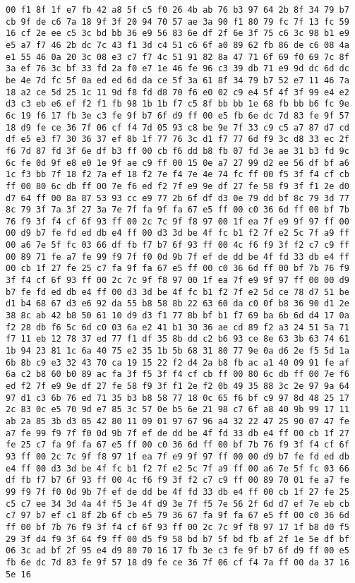 \documentclass{article}
\begin{document}
\begin{verbatim}
00 f1 8f 1f e7 fb 42 a8 5f c5 f0 26 4b ab 76 b3 97 64 2b 8f 34 79 b7 cb 9f de c6 7a 18 9f 3f 20 94 70 57 ae 3a 90 f1 80 79 fc 7f 13 fc 59 16 cf 2e ee c5 3c bd bb 36 e9 56 83 6e df 2f 6e 3f 75 c6 3c 98 b1 e9 e5 a7 f7 46 2b dc 7c 43 f1 3d c4 51 c6 6f a0 89 62 fb 86 de c6 08 4a e1 55 46 0a 20 3c 08 e3 c7 f7 4c 51 91 82 8a 47 71 6f 69 f0 69 7c 8f 3a ef 76 3c bf 33 fd 2a f0 e7 1e 46 fe 96 c3 39 db 71 e9 9d dc 6d dc be 4e 7d fc 5f 0a ed ed 6d da ce 5f 3a 61 8f 34 79 b7 52 e7 11 46 7a 18 a2 ce 5d 25 1c 11 9d f8 fd d8 70 f6 e0 02 c9 e4 5f 4f 3f 99 e4 e2 d3 c3 eb e6 ef f2 f1 fb 98 1b 1b f7 c5 8f bb bb 1e 68 fb bb b6 fc 9e 6c 19 f6 17 fb 3e c3 fe 9f b7 6f d9 ff 00 e5 fb 6e dc 7d 83 fe 9f 57 18 d9 fe ce 36 7f 06 cf f4 7d 05 93 c8 be 9e 7f 33 c9 c5 a7 87 d7 cd df e5 e3 f7 30 36 37 ef 8b 1f 77 76 3c d1 f7 77 6d f9 3c d8 33 ec 2f f6 7d 87 fd 3f 6e df b3 ff 00 cb f6 dd b8 fb 07 fd 3e ae 31 b3 fd 9c 6c fe 0d 9f e8 e0 1e 9f ae c9 ff 00 15 0e a7 27 99 d2 ee 56 df bf a6 1c f3 bb 7f 18 f2 7a ef 18 f2 7e f4 7e 4e 74 fc ff 00 f5 3f f4 cf cb ff 00 80 6c db ff 00 7e f6 ed f2 7f e9 9e df 27 fe 58 f9 3f f1 2e d0 d7 64 ff 00 8a 87 53 93 cc e9 77 2b 6f df d3 0e 79 dd bf 8c 79 3d 77 8c 79 3f 7a 3f 27 3a 7e 7f fa 9f fa 67 e5 ff 00 c0 36 6d ff 00 bf 7b 76 f9 3f f4 cf 6f 93 ff 00 2c 7c 9f f8 97 00 1f ea 7f e9 9f 97 ff 00 00 d9 b7 fe fd ed db e4 ff 00 d3 3d be 4f fc b1 f2 7f e2 5c 7f a9 ff 00 a6 7e 5f fc 03 66 df fb f7 b7 6f 93 ff 00 4c f6 f9 3f f2 c7 c9 ff 00 89 71 fe a7 fe 99 f9 7f f0 0d 9b 7f ef de dd be 4f fd 33 db e4 ff 00 cb 1f 27 fe 25 c7 fa 9f fa 67 e5 ff 00 c0 36 6d ff 00 bf 7b 76 f9 3f f4 cf 6f 93 ff 00 2c 7c 9f f8 97 00 1f ea 7f e9 9f 97 ff 00 00 d9 b7 fe fd ed db e4 ff 00 d3 3d be 4f fc b1 f2 7f e2 5d ce 78 d7 51 be d1 b4 68 67 d3 e6 92 da 55 b8 58 8b 22 63 60 da c0 0f b8 36 90 d1 2e 38 8c ab 42 b8 50 61 10 d9 d3 f1 77 8b bf b1 f7 69 ba 6b 6d d4 17 0a f2 28 db f6 5c 6d c0 03 6a e2 41 b1 30 36 ae cd 89 f2 a3 24 51 5a 71 f7 11 eb 12 78 37 ed 77 f1 df 35 8b dd c2 b6 93 ce 8e 63 3b 63 74 61 1b 94 23 81 1c 6a 40 75 e2 35 1b 5b 68 31 80 77 9e 0a d6 2e f5 5d 1a 6b 8b c9 e3 32 43 70 ca 19 15 22 f2 d4 2a b8 fb ac a1 40 09 91 fe af 6a c2 b8 60 b0 89 ac fa 3f f5 3f f4 cf cb ff 00 80 6c db ff 00 7e f6 ed f2 7f e9 9e df 27 fe 58 f9 3f f1 2e f2 0b 49 35 88 3c 2e 97 9a 64 97 d1 c3 6b 76 ed 71 35 b3 b8 58 77 18 0c 65 f6 bf c9 97 8d 48 25 17 2c 83 0c e5 70 9d e7 85 3c 57 0e b5 6e 21 98 c7 6f a8 40 9b 99 17 11 ab 2a 85 3b d3 05 42 80 11 09 01 97 67 96 a4 32 22 47 25 90 07 47 fe a7 fe 99 f9 7f f0 0d 9b 7f ef de dd be 4f fd 33 db e4 ff 00 cb 1f 27 fe 25 c7 fa 9f fa 67 e5 ff 00 c0 36 6d ff 00 bf 7b 76 f9 3f f4 cf 6f 93 ff 00 2c 7c 9f f8 97 1f ea 7f e9 9f 97 ff 00 00 d9 b7 fe fd ed db e4 ff 00 d3 3d be 4f fc b1 f2 7f e2 5c 7f a9 ff 00 a6 7e 5f fc 03 66 df fb f7 b7 6f 93 ff 00 4c f6 f9 3f f2 c7 c9 ff 00 89 70 01 fe a7 fe 99 f9 7f f0 0d 9b 7f ef de dd be 4f fd 33 db e4 ff 00 cb 1f 27 fe 25 c5 c7 ee 34 3d 4a 4f f5 3e 4f d9 3e 7f f5 7e 56 2f 6d d7 ef 7e eb cb c7 97 b7 ef c1 8f 2b 6f cb e5 79 36 67 fa 9f fa 67 e5 ff 00 c0 36 6d ff 00 bf 7b 76 f9 3f f4 cf 6f 93 ff 00 2c 7c 9f f8 97 17 1f b8 d0 f5 29 3f d4 f9 3f 64 f9 ff 00 d5 f9 58 bd b7 5f bd fb af 2f 1e 5e df bf 06 3c ad bf 2f 95 e4 d9 80 70 16 17 fb 3e c3 fe 9f b7 6f d9 ff 00 e5 fb 6e dc 7d 83 fe 9f 57 18 d9 fe ce 36 7f 06 cf f4 7a ff 00 da 37 16 5e 16 
\end{verbatim}
\end{document}
